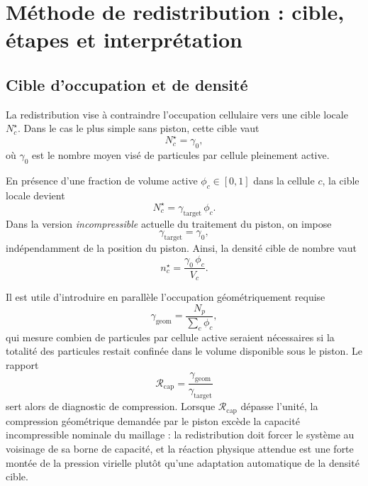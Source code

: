 \documentclass[11pt,a4paper]{article}
\begin{document}
\section{Méthode de redistribution : cible, étapes et interprétation}

\subsection{Cible d'occupation et de densité}

La redistribution vise à contraindre l'occupation cellulaire vers une cible locale $N_c^{\star}$. Dans le cas le plus simple sans piston, cette cible vaut
\begin{equation}
 N_c^{\star} = \gamma_0,
\end{equation}
où $\gamma_0$ est le nombre moyen visé de particules par cellule pleinement active.

En présence d'une fraction de volume active $\phi_c\in[0,1]$ dans la cellule $c$, la cible locale devient
\begin{equation}
 N_c^{\star} = \gamma_{\mathrm{target}}\,\phi_c.
\end{equation}
Dans la version \emph{incompressible} actuelle du traitement du piston, on impose
\begin{equation}
 \gamma_{\mathrm{target}} = \gamma_0,
\end{equation}
indépendamment de la position du piston. Ainsi, la densité cible de nombre vaut
\begin{equation}
 n_c^{\star} = \frac{\gamma_0\,\phi_c}{V_c}.
\end{equation}

Il est utile d'introduire en parallèle l'occupation géométriquement requise
\begin{equation}
 \gamma_{\mathrm{geom}} = \frac{N_p}{\sum_c \phi_c},
\end{equation}
qui mesure combien de particules par cellule active seraient nécessaires si la totalité des particules restait confinée dans le volume disponible sous le piston. Le rapport
\begin{equation}
 \mathcal{R}_{\mathrm{cap}} = \frac{\gamma_{\mathrm{geom}}}{\gamma_{\mathrm{target}}}
\end{equation}
sert alors de diagnostic de compression. Lorsque \(\mathcal{R}_{\mathrm{cap}}\) dépasse l'unité, la compression géométrique demandée par le piston excède la capacité incompressible nominale du maillage : la redistribution doit forcer le système au voisinage de sa borne de capacité, et la réaction physique attendue est une forte montée de la pression virielle plutôt qu'une adaptation automatique de la densité cible.
\end{document}
